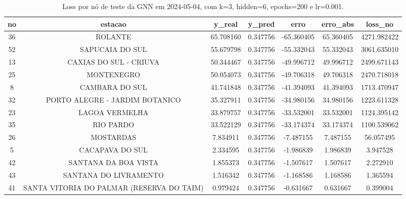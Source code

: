 \begin{table}[h]
\centering
\caption{Loss por nó de teste da GNN em 2024-05-04, com k=3, hidden=6, epochs=200 e lr=0.001.}
\label{tab:gnn_loss_nodes_k3_hidden6}
\begin{tabular}{ccccccc}
\toprule
no & estacao & y\_real & y\_pred & erro & erro\_abs & loss\_no \\
\midrule
36 & ROLANTE & 65.708160 & 0.347756 & -65.360405 & 65.360405 & 4271.982422 \\
52 & SAPUCAIA DO SUL & 55.679798 & 0.347756 & -55.332043 & 55.332043 & 3061.635010 \\
13 & CAXIAS DO SUL - CRIUVA & 50.344467 & 0.347756 & -49.996712 & 49.996712 & 2499.671143 \\
25 & MONTENEGRO & 50.054073 & 0.347756 & -49.706318 & 49.706318 & 2470.718018 \\
8 & CAMBARA DO SUL & 41.741848 & 0.347756 & -41.394093 & 41.394093 & 1713.470947 \\
32 & PORTO ALEGRE - JARDIM BOTANICO & 35.327911 & 0.347756 & -34.980156 & 34.980156 & 1223.611328 \\
23 & LAGOA VERMELHA & 33.879757 & 0.347756 & -33.532001 & 33.532001 & 1124.395142 \\
35 & RIO PARDO & 33.522129 & 0.347756 & -33.174374 & 33.174374 & 1100.539062 \\
26 & MOSTARDAS & 7.834911 & 0.347756 & -7.487155 & 7.487155 & 56.057495 \\
5 & CACAPAVA DO SUL & 2.334595 & 0.347756 & -1.986839 & 1.986839 & 3.947528 \\
42 & SANTANA DA BOA VISTA & 1.855373 & 0.347756 & -1.507617 & 1.507617 & 2.272910 \\
43 & SANTANA DO LIVRAMENTO & 1.516342 & 0.347756 & -1.168586 & 1.168586 & 1.365594 \\
41 & SANTA VITORIA DO PALMAR (RESERVA DO TAIM) & 0.979424 & 0.347756 & -0.631667 & 0.631667 & 0.399004 \\
\bottomrule
\end{tabular}
\end{table}
